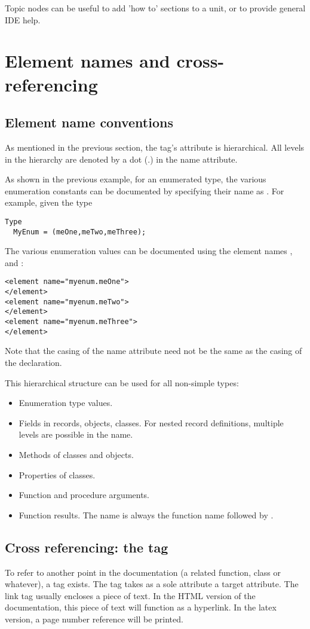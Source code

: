 Topic nodes can be useful to add 'how to' sections to a unit, or to provide
general IDE help.

\section{Element names and cross-referencing}

\subsection{Element name conventions}
As mentioned in the previous section, the  tag's 
attribute is hierarchical. All levels in the hierarchy are denoted by a dot
(.) in the name attribute. 

As shown in the previous example, for an enumerated type, the various
enumeration constants can be documented by specifying their name as
. For example, given the type
\begin{verbatim}
Type
  MyEnum = (meOne,meTwo,meThree);
\end{verbatim}
The various enumeration values can be documented using the element names
,  and :
\begin{verbatim}
<element name="myenum.meOne">
</element>
<element name="myenum.meTwo">
</element>
<element name="myenum.meThree">
</element>
\end{verbatim}
Note that the casing of the name attribute need not be the same as the
casing of the declaration.

This hierarchical structure can be used for all non-simple types: 
\begin{itemize}
\item Enumeration type values.
\item Fields in records, objects, classes. For nested record definitions,
multiple levels are possible in the name.
\item Methods of classes and objects.
\item Properties of classes.
\item Function and procedure arguments. 
\item Function results. The name is always the function name followed by
.
\end{itemize}

\subsection{Cross referencing: the  tag}
To refer to another point in the documentation (a related function, class or
whatever), a  tag exists. The  tag takes as a sole
attribute a target  attribute. The link tag usually encloses a
piece of text. In the HTML version of the documentation, this piece of text
will function as a hyperlink. In the latex version, a page number reference
will be printed. 

